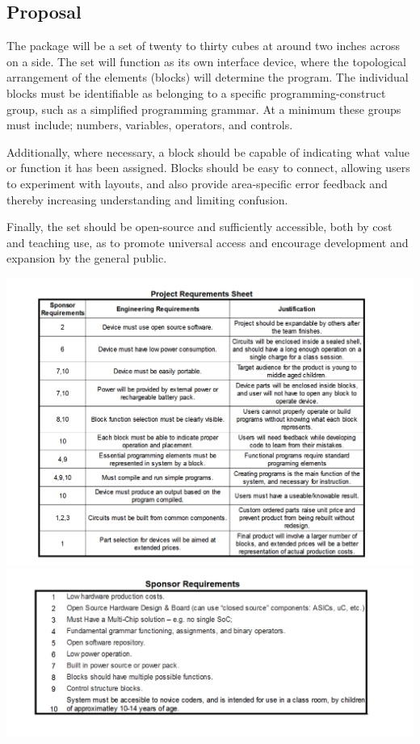 \documentclass[12pt,a4paper]{article}
\begin{document}
\subsection{Proposal}
The package will be a set of twenty to thirty cubes at around two inches across on a side. The set will function as its own interface device, where the topological arrangement of the elements (blocks) will determine the program. The individual blocks must be identifiable as belonging to a specific programming-construct group, such as a simplified programming grammar. At a minimum these groups must include; numbers, variables, operators, and controls.


Additionally, where necessary, a block should be capable of indicating what value or function it has been assigned. Blocks should be easy to connect, allowing users to experiment with layouts, and also provide area-specific error feedback and thereby increasing understanding and limiting confusion.


Finally, the set should be open-source and sufficiently accessible, both by cost and teaching use, as to promote universal access and encourage development and expansion by the general public.

\includegraphics[width=6.5in]{pds.png}\\
\includegraphics[width=6.5in]{sprq.png}
\end{document}
